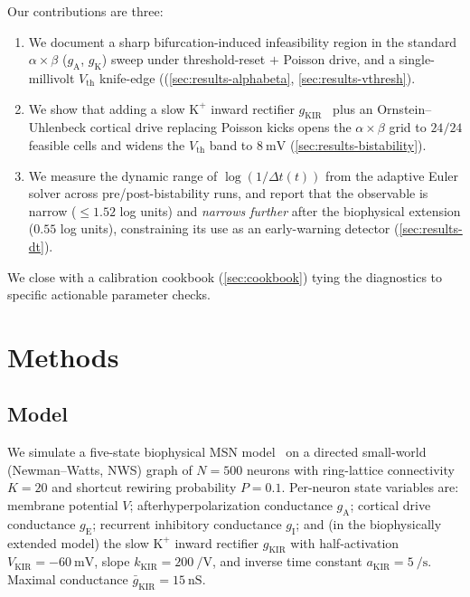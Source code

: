\documentclass[11pt]{article}
\newcommand{\dt}{\Delta t}
\newcommand{\Vth}{V_{\text{th}}}
\newcommand{\gA}{g_{\text{A}}}
\newcommand{\gE}{g_{\text{E}}}
\newcommand{\gI}{g_{\text{I}}}
\newcommand{\gK}{g_{\text{K}}}
\newcommand{\gKIR}{g_{\text{KIR}}}
\begin{document}
Our contributions are three:
\begin{enumerate}
  \item We document a sharp bifurcation-induced infeasibility region
        in the standard $\alpha\times\beta$ ($\gA{}$, $\gK{}$) sweep
        under threshold-reset $+$ Poisson drive, and a single-
        millivolt $\Vth$ knife-edge ((\cref{sec:results-alphabeta},
        \cref{sec:results-vthresh}).
  \item We show that adding a slow $\text{K}^+$ inward rectifier
        $\gKIR$~\cite{wilson1996, mahon2006, nisenbaum1995} plus an
        Ornstein--Uhlenbeck cortical drive replacing Poisson kicks
        opens the $\alpha\times\beta$ grid to $24/24$ feasible cells
        and widens the $\Vth$ band to $\SI{8}{\milli\volt}$
        (\cref{sec:results-bistability}).
  \item We measure the dynamic range of $\log(1/\dt(t))$ from the
        adaptive Euler solver across pre/post-bistability runs, and
        report that the observable is narrow ($\le\!1.52$ log units)
        and \emph{narrows further} after the biophysical extension
        ($0.55$ log units), constraining its use as an early-warning
        detector (\cref{sec:results-dt}).
\end{enumerate}

We close with a calibration cookbook (\cref{sec:cookbook}) tying the
diagnostics to specific actionable parameter checks.

\section{Methods}
\label{sec:methods}

\subsection{Model}
\label{sec:methods-model}

We simulate a five-state biophysical MSN
model~\cite{koos2004, wilson1996, mahon2006} on a directed
small-world (Newman--Watts, NWS) graph of $N=500$ neurons with
ring-lattice connectivity $K=20$ and shortcut rewiring probability
$P=0.1$. Per-neuron state variables are: membrane potential $V$;
afterhyperpolarization conductance $\gA$; cortical drive conductance
$\gE$; recurrent inhibitory conductance $\gI$; and (in the
biophysically extended model) the slow $\text{K}^+$ inward rectifier
$\gKIR$ with half-activation $V_{\text{KIR}} = \SI{-60}{\milli\volt}$,
slope $k_{\text{KIR}} = \SI{200}{\per\volt}$, and inverse time
constant $a_{\text{KIR}} = \SI{5}{\per\second}$. Maximal conductance
$\bar{g}_{\text{KIR}} = \SI{15}{\nano\siemens}$.
\end{document}
